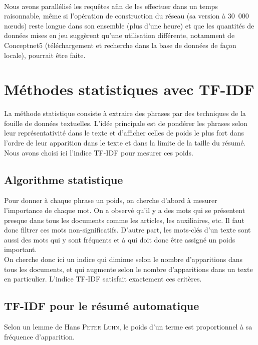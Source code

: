 \documentclass[a4paper, 12pt]{article}
\begin{document}
\paragraph{}
Nous avons parallélisé les requêtes afin de les effectuer dans un temps raisonnable, même si l'opération de construction du réseau (sa version à 30~000 n\oe{}uds) reste longue dans son ensemble (plus d'une heure) et que les quantités de données mises en jeu suggèrent qu'une utilisation différente, notamment de Conceptnet5 (téléchargement et recherche dans la base de données de façon locale), pourrait être faite.



\section{Méthodes statistiques avec TF-IDF}\label{Section:TFIDF}

La méthode statistique consiste à extraire des phrases par des techniques de la fouille de données textuelles. L'idée principale est de pondérer les phrases selon leur représentativité dans le texte et d'afficher celles de poids le plus fort dans l'ordre de leur apparition dans le texte et dans la limite de la taille du résumé. Nous avons choisi ici l'indice TF-IDF pour mesurer ces poids.

\subsection{Algorithme statistique}

Pour donner à chaque phrase un poids, on cherche d'abord à mesurer l'importance de chaque mot. On a observé qu'il y a des mots qui se présentent presque dans tous les documents comme les articles, les auxiliaires, etc. Il faut donc filtrer ces mots non-significatifs. D'autre part, les mots-clés d'un texte sont aussi des mots qui y sont fréquents et à qui doit donc être assigné un poids important.\\

On cherche donc ici un indice qui diminue selon le nombre d'apparitions dans tous les documents, et qui augmente selon le nombre d'apparitions dans un texte en particulier. L'indice TF-IDF satisfait exactement ces critères.


\subsection{TF-IDF pour le résumé automatique}\label{Subsection:TFIDFResume}
Selon un lemme de Hans \textsc{Peter Luhn}, le poids d'un terme est proportionnel à sa fréquence d'apparition.
\end{document}
